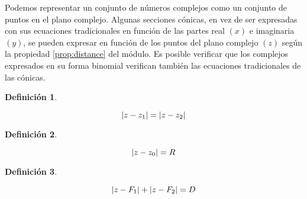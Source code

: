 \documentclass[a5paper,12pt,twoside]{book}
\newtheorem{defn}{{Definición}}[chapter]
\begin{document}
Podemos representar un conjunto de números complejos como un conjunto de puntos en el plano complejo. Algunas secciones cónicas, en vez de ser expresadas con sus ecuaciones tradicionales en función de las partes real $(x)$ e imaginaria $(y)$, se pueden expresar en función de los puntos del plano complejo $(z)$ según la propiedad \ref{prop:distance} del módulo. Es posible verificar que los complejos expresados en su forma binomial verifican también las ecuaciones tradicionales de las cónicas.

\begin{mdframed}[style=MyFrame1]
    \begin{defn}
    \end{defn}
    \begin{equation*}
        {\left| {z-z_1} \right|} = {\left| {z-z_2} \right|}
    \end{equation*}
\end{mdframed}

\begin{center}
\end{center}

\begin{mdframed}[style=MyFrame1]
    \begin{defn}
    \end{defn}
    \begin{equation*}
        {\left| {z-z_0} \right|} = R
    \end{equation*}
\end{mdframed}

\begin{center}
\end{center}

\begin{mdframed}[style=MyFrame1]
    \begin{defn}
    \end{defn}
    \begin{equation*}
        {\left| {z-F_1} \right|} + {\left| {z-F_2} \right|} = D
    \end{equation*}
\end{mdframed}
\end{document}

